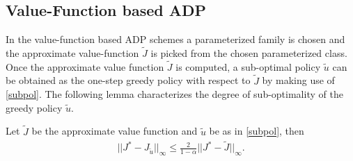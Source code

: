 \subsection{Value-Function based ADP}
In the value-function based ADP schemes a parameterized family is chosen and the approximate value-function $\tilde{J}$ is picked from the chosen parameterized class.
Once the approximate value function $\tilde{J}$ is computed, a sub-optimal policy $\tilde{u}$ can be obtained as the one-step greedy policy with respect to $\tilde{J}$ by making use of \eqref{subpol}.
The following lemma characterizes the degree of sub-optimality of the greedy policy $\tilde{u}$.
\begin{lemma}\label{subopt}
Let $\tilde{J}$ be the approximate value function and $\tilde{u}$ be as in \eqref{subpol}, then 
\begin{align}
||J^*-J_{\tilde{u}}||_\infty \leq \frac{2}{1-\alpha}||J^*-\tilde{J}||_\infty.
\end{align}
\end{lemma}
\begin{comment}
\begin{proof}
We know that
\begin{align}
\label{top} (T_{\tilde{u}}) \tilde{J}(s) 	&= g(s)+\alpha \sum_{s'} p_{\tilde{u}(s)} (s,s') \tilde{J}(s'),\\
\label{bot} J_{\tilde{u}}(s)		&=g(s)+\alpha \sum_{s'} p_{\tilde{u}(s)}(s,s')J_{\tilde{u}}(s').
\end{align}
Hence we can write by subtracting \eqref{top} from \eqref{bot} 
\begin{align}
J_{\tilde{u}}-\tilde{J}&=T_{\tilde{u}}\tilde{J}-\tilde{J} +\alpha P_{\tilde{u}}(J_{\tilde{u}}-\tilde{J}),\mb\text{or},\nn\\
J_{\tilde{u}}-\tilde{J}&=(I-\alpha P_{\tilde{u}})^{-1}(T_{\tilde{u}}\tilde{J}-\tilde{J}),\mb \text{hence}\nn\\
||J_{\tilde{u}}-\tilde{J}||_\infty&\leq \frac{1}{1-\alpha}||T_{\tilde{u}}\tilde{J}-\tilde{J}||_\infty.\nn
\end{align}
We know from \eqref{subpol} that $T_{\tilde{u}}\tilde{J}=T\tilde{J}$. Also from the fact that $J^*=TJ^*$ and the contraction property of $T$, we know $||T\tilde{J}-J^*||_\infty\leq \alpha ||\tilde{J}-J^*||_\infty$ and $||T_{\tilde{u}}\tilde{J}-\tilde{J}||_\infty\leq (1+\alpha)||\tilde{J}-J^*||_\infty$. Hence we have
\begin{align}
||J_{\tilde{u}}-J^*||_\infty&=||J_{\tilde{u}}-J^*+\tilde{J}-\tilde{J}||_\infty\nn\\
&\leq  ||J_{\tilde{u}}-\tilde{J}||_\infty+||\tilde{J}-J^*||_\infty\nn\\
&\leq \frac{1}{1-\alpha}||T_{\tilde{u}}\tilde{J}-\tilde{J}||_\infty +||J^*-\tilde{J}||_\infty\nn\\
&\leq \frac{1+\alpha}{1-\alpha}||J^*-\tilde{J}||_\infty +||J^*-\tilde{J}||_\infty\nn\\
&\leq \frac{2}{1-\alpha}||J^*-\tilde{J}||_\infty\nn.
\end{align}
\end{proof}
\end{comment}
